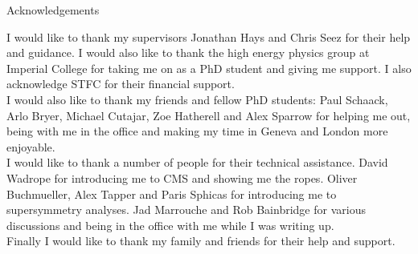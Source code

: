 {\bf \centerline{\Large Acknowledgements}}

\vspace{1cm}

I would like to thank my supervisors Jonathan Hays and Chris Seez for their help
and guidance. I would also like to thank the high energy physics group at
Imperial College for taking me on as a PhD student and giving me support. I also 
acknowledge STFC for their financial support. \\

I would also like to thank my friends and fellow PhD students: Paul Schaack, 
Arlo Bryer, Michael Cutajar, Zoe Hatherell and Alex Sparrow for helping me out, 
being with me in the office and making my time in Geneva and London more 
enjoyable. \\

I would like to thank a number of people for their technical assistance. David 
Wadrope for introducing me to CMS and showing me the ropes. Oliver Buchmueller, 
Alex Tapper and Paris Sphicas for introducing me to supersymmetry analyses. Jad
Marrouche and Rob Bainbridge for various discussions and being in the office
with me while I was writing up. \\

Finally I would like to thank my family and friends for their help and support.
